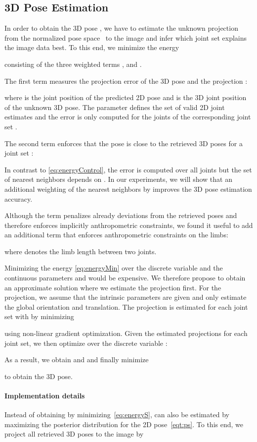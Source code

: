 \documentclass[10pt,twocolumn,letterpaper]{article}
\newcommand{\nspacet}{\mbox{}}
\begin{document}
\subsection{3D Pose Estimation}\label{sec:posrec}
In order to obtain the 3D pose , we have to estimate the unknown projection  from the normalized pose space \nspacet\ to the image and infer which joint set  explains the image data best. To this end, we minimize the energy

consisting of the three weighted terms ,  and .

The first term  measures the projection error of the 3D pose  and the projection :

where  is the joint position of the predicted 2D pose and  is the 3D joint position of the unknown 3D pose. The parameter  defines the set of valid 2D joint estimates and the error is only computed for the joints of the corresponding joint set .

The second term enforces that the pose  is close to the retrieved 3D poses  for a joint set :

In contrast to \eqref{eq:energyControl}, the error is computed over all joints but the set of nearest neighbors depends on . In our experiments, we will show that an additional weighting of the nearest neighbors by  improves the 3D pose estimation accuracy.

Although the term  penalizes already deviations from the retrieved poses and therefore enforces implicitly anthropometric constraints, we found it useful to add an additional term that enforces anthropometric constraints on the limbs:

where  denotes the limb length between two joints.

Minimizing the energy  \eqref{eq:energyMin} over the discrete variable  and the continuous parameters  and  would be expensive. We therefore propose to obtain an approximate solution where we estimate the projection  first. For the projection, we assume that the intrinsic parameters are given and only estimate the global orientation and translation.
The projection  is estimated for each joint set  with  by minimizing

using non-linear gradient optimization. Given the estimated projections  for each joint set, we then optimize over the discrete variable :

As a result, we obtain  and  and finally minimize

to obtain the 3D pose.

\paragraph{Implementation details} Instead of obtaining  by minimizing~\eqref{eq:energyS},  can also be estimated by maximizing the posterior distribution for the 2D pose~\eqref{eqt:ps}.
To this end, we project all retrieved 3D poses to the image by
\end{document}
